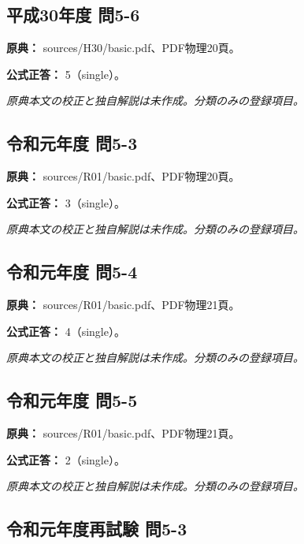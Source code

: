 \subsection{平成30年度 問5-6}
\label{q:h30-reg-basic-5-6}

\noindent\textbf{原典：} sources/H30/basic.pdf、PDF物理20頁。

\textbf{公式正答：} 5（single）。

\par\textit{原典本文の校正と独自解説は未作成。分類のみの登録項目。}

\subsection{令和元年度 問5-3}
\label{q:r01-reg-basic-5-3}

\noindent\textbf{原典：} sources/R01/basic.pdf、PDF物理20頁。

\textbf{公式正答：} 3（single）。

\par\textit{原典本文の校正と独自解説は未作成。分類のみの登録項目。}

\subsection{令和元年度 問5-4}
\label{q:r01-reg-basic-5-4}

\noindent\textbf{原典：} sources/R01/basic.pdf、PDF物理21頁。

\textbf{公式正答：} 4（single）。

\par\textit{原典本文の校正と独自解説は未作成。分類のみの登録項目。}

\subsection{令和元年度 問5-5}
\label{q:r01-reg-basic-5-5}

\noindent\textbf{原典：} sources/R01/basic.pdf、PDF物理21頁。

\textbf{公式正答：} 2（single）。

\par\textit{原典本文の校正と独自解説は未作成。分類のみの登録項目。}

\subsection{令和元年度再試験 問5-3}
\label{q:r01-ret-basic-5-3}

